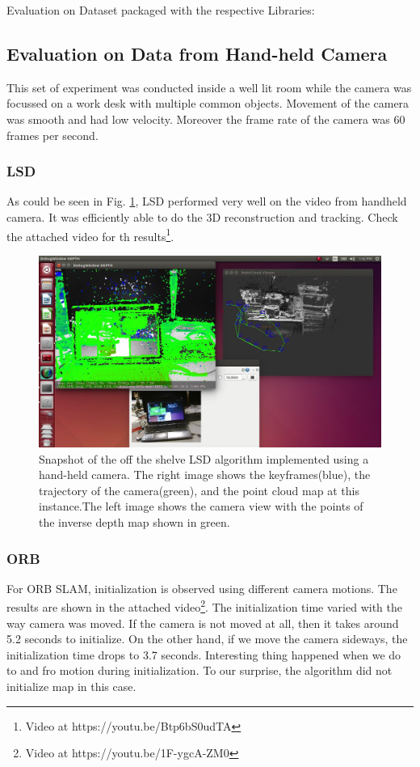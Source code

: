 Evaluation on Dataset packaged with the respective Libraries:
\subsection{Evaluation on Data from Hand-held Camera}
This set of experiment was conducted inside a well lit room while the camera was focussed on a work desk with multiple common objects. Movement of the camera was smooth and had low velocity. Moreover the frame rate of the camera was 60 frames per second.

\subsubsection{LSD}
As could be seen in Fig. \ref{fig:handheldlsd}, LSD performed very well on the video from handheld camera. It was efficiently able to do the 3D reconstruction and tracking. Check the attached video for th results\footnote{Video at https://youtu.be/Btp6bS0udTA}.

\begin{figure}[H]
	\centering
	\includegraphics[width=1.0\linewidth]{figures/handHeld_LSD}
	\caption{Snapshot of the off the shelve LSD algorithm implemented using a hand-held camera. The right image shows the keyframes(blue), the trajectory of the camera(green), and the point cloud map at this instance.The left image shows the camera view with the points of the inverse depth map shown in green.}
	\label{fig:handheldlsd}
\end{figure}

\subsubsection{ORB}
For ORB SLAM, initialization is observed using different camera motions. The results are shown in the attached video\footnote{Video at https://youtu.be/1F-ygcA-ZM0\label{xx}}. The initialization time varied with the way camera was moved. If the camera is not moved at all, then it takes around 5.2 seconds to initialize. On the other hand, if we move the camera sideways, the initialization time drops to 3.7 seconds. Interesting thing happened when we do to and fro motion during initialization. To our surprise, the algorithm did not initialize map in this case.

